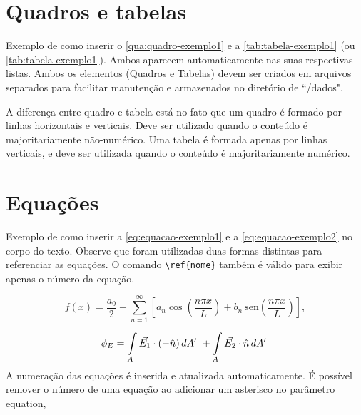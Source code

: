 \section{Quadros e tabelas}
\label{sec:tabelas}

Exemplo de como inserir o \autoref{qua:quadro-exemplo1} e a \autoref{tab:tabela-exemplo1} (ou \cref{tab:tabela-exemplo1}). Ambos aparecem automaticamente nas suas respectivas listas.
Ambos os elementos (Quadros e Tabelas) devem ser criados em arquivos separados para facilitar manutenção e armazenados no diretório de ``/dados".



A diferença entre quadro e tabela está no fato que um quadro é formado por linhas horizontais e verticais. Deve ser utilizado quando o conteúdo é majoritariamente não-numérico. Uma tabela é formada apenas por linhas verticais, e deve ser utilizada quando o conteúdo é majoritariamente numérico.



\section{Equações}
\label{sec:equacoes}

Exemplo de como inserir a \autoref{eq:equacao-exemplo1} e a \cref{eq:equacao-exemplo2} no corpo do texto. Observe que foram utilizadas duas formas distintas para referenciar as equações. O comando \verb|\ref{nome}| também é válido para exibir apenas o número da equação.

\begin{equation}
    \label{eq:equacao-exemplo1}
    f(x) = \frac{a_0}{2} + \sum_{n=1}^{\infty} \left[a_n \cos{ \left( \frac{ n\pi x}{L} \right) }  +  b_n  \: \mathrm{sen}{ \left( \frac{ n\pi x}{L} \right) }     \right]
    ,
\end{equation}

\begin{align}
    \phi_E  = \int \limits_{A} \Vec{E_1}\cdot (-\Hat{n}) \, dA'\ + \int \limits_{A} \Vec{E_2}\cdot \Hat{n} \, dA'\
    \label{eq:equacao-exemplo2}
\end{align}
\noindent
A numeração das equações é inserida e atualizada automaticamente. É possível remover o número de uma equação ao adicionar um asterisco no parâmetro  {\ttfamily equation},


